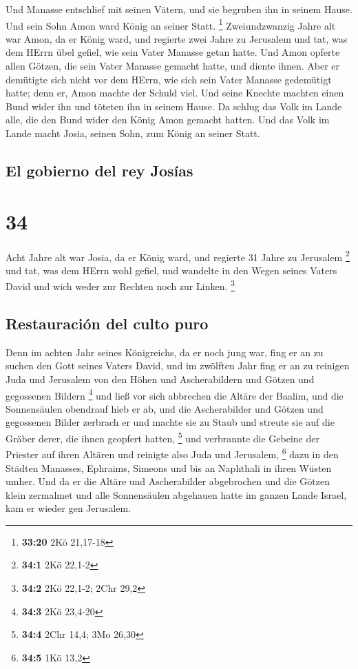  Und Manasse entschlief mit seinen Vätern, und sie
begruben ihn in seinem Hause. Und sein Sohn Amon ward König an seiner
Statt. \footnote{\textbf{33:20} 2Kö 21,17-18} 
Zweiundzwanzig Jahre alt war Amon, da er König ward, und regierte zwei
Jahre zu Jerusalem  und tat, was dem HErrn übel gefiel,
wie sein Vater Manasse getan hatte. Und Amon opferte allen Götzen, die
sein Vater Manasse gemacht hatte, und diente ihnen.  Aber
er demütigte sich nicht vor dem HErrn, wie sich sein Vater Manasse
gedemütigt hatte; denn er, Amon machte der Schuld viel. 
Und seine Knechte machten einen Bund wider ihn und töteten ihn in seinem
Hause.  Da schlug das Volk im Lande alle, die den Bund
wider den König Amon gemacht hatten. Und das Volk im Lande macht Josia,
seinen Sohn, zum König an seiner Statt.

\hypertarget{el-gobierno-del-rey-josuxedas}{%
\subsection{El gobierno del rey
Josías}\label{el-gobierno-del-rey-josuxedas}}

\hypertarget{section-33}{%
\section{34}\label{section-33}}

 Acht Jahre alt war Josia, da er König ward, und regierte
31 Jahre zu Jerusalem \footnote{\textbf{34:1} 2Kö 22,1-2} 
und tat, was dem HErrn wohl gefiel, und wandelte in den Wegen seines
Vaters David und wich weder zur Rechten noch zur Linken. \footnote{\textbf{34:2}
  2Kö 22,1-2; 2Chr 29,2}

\hypertarget{restauraciuxf3n-del-culto-puro}{%
\subsection{Restauración del culto
puro}\label{restauraciuxf3n-del-culto-puro}}

 Denn im achten Jahr seines Königreichs, da er noch jung
war, fing er an zu suchen den Gott seines Vaters David, und im zwölften
Jahr fing er an zu reinigen Juda und Jerusalem von den Höhen und
Ascherabildern und Götzen und gegossenen Bildern \footnote{\textbf{34:3}
  2Kö 23,4-20}  und ließ vor sich abbrechen die Altäre der
Baalim, und die Sonnensäulen obendrauf hieb er ab, und die Ascherabilder
und Götzen und gegossenen Bilder zerbrach er und machte sie zu Staub und
streute sie auf die Gräber derer, die ihnen geopfert hatten, \footnote{\textbf{34:4}
  2Chr 14,4; 3Mo 26,30}  und verbrannte die Gebeine der
Priester auf ihren Altären und reinigte also Juda und Jerusalem,
\footnote{\textbf{34:5} 1Kö 13,2}  dazu in den Städten
Manasses, Ephraims, Simeons und bis an Naphthali in ihren Wüsten umher.
 Und da er die Altäre und Ascherabilder abgebrochen und
die Götzen klein zermalmet und alle Sonnensäulen abgehauen hatte im
ganzen Lande Israel, kam er wieder gen Jerusalem.

